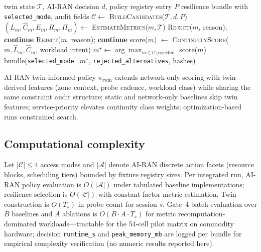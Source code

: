 \begin{algorithm}[t]
\caption{Service-aware multi-access resilience selection (template)}
\label{alg:resilience}
\begin{algorithmic}[1]
\REQUIRE twin state $\mathcal{T}$, AI-RAN decision $d$, policy registry entry $P$
\ENSURE resilience bundle with \texttt{selected\_mode}, audit fields
\STATE $\mathcal{C} \leftarrow$ \textsc{BuildCandidates}($\mathcal{T}, d, P$) 
  \STATE $(\hat{L}_m, \hat{C}_m, E_m, R_m, \Pi_m) \leftarrow$ \textsc{EstimateMetrics}($m, \mathcal{T}$)
    \STATE \textsc{Reject}($m$, reason); \textbf{continue}
  \ENDIF
    \STATE \textsc{Reject}($m$, reason); \textbf{continue}
  \ENDIF
  \STATE score($m$) $\leftarrow$ \textsc{ContinuityScore}($m, \hat{L}_m, \hat{C}_m$, workload intent)
\ENDFOR
\STATE $m^\star \leftarrow \arg\max_{m \in \mathcal{C} \setminus \text{rejected}}$ score($m$)
\RETURN bundle(\texttt{selected\_mode}=$m^\star$, \texttt{rejected\_alternatives}, hashes)
\end{algorithmic}
\end{algorithm}

AI-RAN twin-informed policy $\pi_{\text{twin}}$ extends network-only scoring with twin-derived features (zone context, probe cadence, workload class) while sharing the same constraint audit structure; static and network-only baselines skip twin features; service-priority elevates continuity class weights; optimization-based runs constrained search.

\subsection{Computational complexity}
Let $|\mathcal{C}| \le 4$ access modes and $|\mathcal{A}|$ denote AI-RAN discrete action facets (resource blocks, scheduling tiers) bounded by fixture registry sizes.
Per integrated run, AI-RAN policy evaluation is $O(|\mathcal{A}|)$ under tabulated baseline implementations; resilience selection is $O(|\mathcal{C}|)$ with constant-factor metric estimation.
Twin construction is $O(T_s)$ in probe count for session $s$.
Gate~4 batch evaluation over $B$ baselines and $A$ ablations is $O(B \cdot A \cdot T_s)$ for metric recomputation-dominated workloads---tractable for the 54-cell pilot matrix on commodity hardware; decision \texttt{runtime\_s} and \texttt{peak\_memory\_mb} are logged per bundle for empirical complexity verification (no numeric results reported here).
